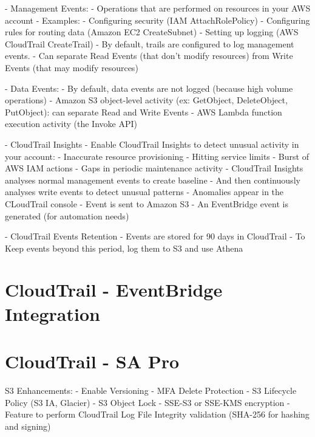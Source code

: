 \documentclass[11pt]{book}
\begin{document}

    - Management Events:
        - Operations that are performed on resources in your AWS account
        - Examples:
            - Configuring security (IAM AttachRolePolicy)
            - Configuring rules for routing data (Amazon EC2 CreateSubnet)
            - Setting up logging (AWS CloudTrail CreateTrail)
        - By default, trails are configured to log management events.
        - Can separate Read Events (that don't modify resources) from Write Events (that may modify resources)

    - Data Events:
        - By default, data events are not logged (because high volume operations)
        - Amazon S3 object-level activity (ex: GetObject, DeleteObject, PutObject): can separate Read and Write Events
        - AWS Lambda function execution activity (the Invoke API)

    - CloudTrail Insights
        - Enable CloudTrail Insights to detect unusual activity in your account:
            - Inaccurate resource provisioning
            - Hitting service limits
            - Burst of AWS IAM actions
            - Gaps in periodic maintenance activity
    - CloudTrail Insights analyses normal management events to create baseline
    - And then continuously analyses write events to detect unusual patterns
        - Anomalies appear in the CLoudTrail console
        - Event is sent to Amazon S3
        - An EventBridge event is generated (for automation needs)


    - CloudTrail Events Retention
        - Events are stored for 90 days in CloudTrail
        - To Keep events beyond this period, log them to S3 and use Athena


    \section{CloudTrail - EventBridge Integration}


    \section{CloudTrail - SA Pro}
    S3 Enhancements:
    - Enable Versioning
    - MFA Delete Protection
    - S3 Lifecycle Policy (S3 IA, Glacier)
    - S3 Object Lock
    - SSE-S3 or SSE-KMS encryption
    - Feature to perform CloudTrail Log File Integrity validation (SHA-256 for hashing and signing)
\end{document}
